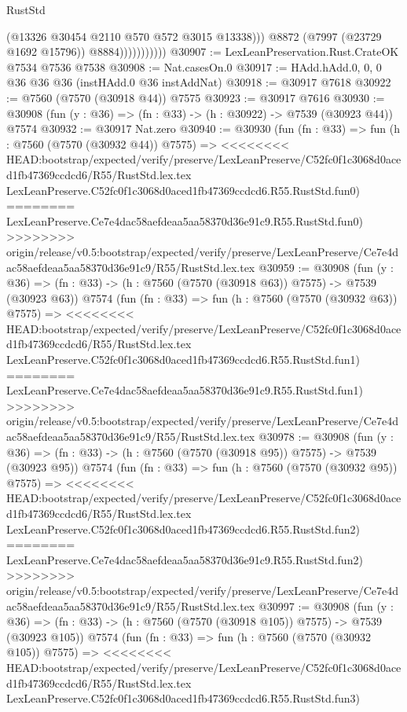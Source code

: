 \begin{lexlean}{RustStd}
\begin{coremodule}
{\begin{coremodule}
{{{{{{{{{{{{{{{{{{{{{{{{{{{{{{{{{{{{{{{{{{{                              (@13326 @30454 @2110 @570 @572 @3015 @13338)))
                          @8872
                          (@7997 (@23729 @1692 @15796))
                          @8884)))))))))))
@30907 := LexLeanPreservation.Rust.CrateOK @7534 @7536 @7538
@30908 := Nat.casesOn.{0}
@30917 := HAdd.hAdd.{0, 0, 0} @36 @36 @36 (instHAdd.{0} @36 instAddNat)
@30918 := @30917 @7618
@30922 := @7560 (@7570 (@30918 @44)) @7575
@30923 := @30917 @7616
@30930 := @30908 (fun (y : @36) => (fn : @33) -> (h : @30922) -> @7539 (@30923 @44)) @7574
@30932 := @30917 Nat.zero
@30940 := @30930
    (fun (fn : @33) =>
    fun (h : @7560 (@7570 (@30932 @44)) @7575) =>
<<<<<<<< HEAD:bootstrap/expected/verify/preserve/LexLeanPreserve/C52fc0f1c3068d0aced1fb47369ccdcd6/R55/RustStd.lex.tex
    LexLeanPreserve.C52fc0f1c3068d0aced1fb47369ccdcd6.R55.RustStd.fun0)
========
    LexLeanPreserve.Ce7e4dac58aefdeaa5aa58370d36e91c9.R55.RustStd.fun0)
>>>>>>>> origin/release/v0.5:bootstrap/expected/verify/preserve/LexLeanPreserve/Ce7e4dac58aefdeaa5aa58370d36e91c9/R55/RustStd.lex.tex
@30959 := @30908
    (fun (y : @36) => (fn : @33) -> (h : @7560 (@7570 (@30918 @63)) @7575) -> @7539 (@30923 @63))
    @7574
    (fun (fn : @33) =>
    fun (h : @7560 (@7570 (@30932 @63)) @7575) =>
<<<<<<<< HEAD:bootstrap/expected/verify/preserve/LexLeanPreserve/C52fc0f1c3068d0aced1fb47369ccdcd6/R55/RustStd.lex.tex
    LexLeanPreserve.C52fc0f1c3068d0aced1fb47369ccdcd6.R55.RustStd.fun1)
========
    LexLeanPreserve.Ce7e4dac58aefdeaa5aa58370d36e91c9.R55.RustStd.fun1)
>>>>>>>> origin/release/v0.5:bootstrap/expected/verify/preserve/LexLeanPreserve/Ce7e4dac58aefdeaa5aa58370d36e91c9/R55/RustStd.lex.tex
@30978 := @30908
    (fun (y : @36) => (fn : @33) -> (h : @7560 (@7570 (@30918 @95)) @7575) -> @7539 (@30923 @95))
    @7574
    (fun (fn : @33) =>
    fun (h : @7560 (@7570 (@30932 @95)) @7575) =>
<<<<<<<< HEAD:bootstrap/expected/verify/preserve/LexLeanPreserve/C52fc0f1c3068d0aced1fb47369ccdcd6/R55/RustStd.lex.tex
    LexLeanPreserve.C52fc0f1c3068d0aced1fb47369ccdcd6.R55.RustStd.fun2)
========
    LexLeanPreserve.Ce7e4dac58aefdeaa5aa58370d36e91c9.R55.RustStd.fun2)
>>>>>>>> origin/release/v0.5:bootstrap/expected/verify/preserve/LexLeanPreserve/Ce7e4dac58aefdeaa5aa58370d36e91c9/R55/RustStd.lex.tex
@30997 := @30908
    (fun (y : @36) => (fn : @33) -> (h : @7560 (@7570 (@30918 @105)) @7575) -> @7539 (@30923 @105))
    @7574
    (fun (fn : @33) =>
    fun (h : @7560 (@7570 (@30932 @105)) @7575) =>
<<<<<<<< HEAD:bootstrap/expected/verify/preserve/LexLeanPreserve/C52fc0f1c3068d0aced1fb47369ccdcd6/R55/RustStd.lex.tex
    LexLeanPreserve.C52fc0f1c3068d0aced1fb47369ccdcd6.R55.RustStd.fun3)
}}}}}}}}}}}}}}}}}}}}}}}}}}}}}}}}}}}}}}}}}}}
\end{coremodule}}
\end{coremodule}
\end{lexlean}
